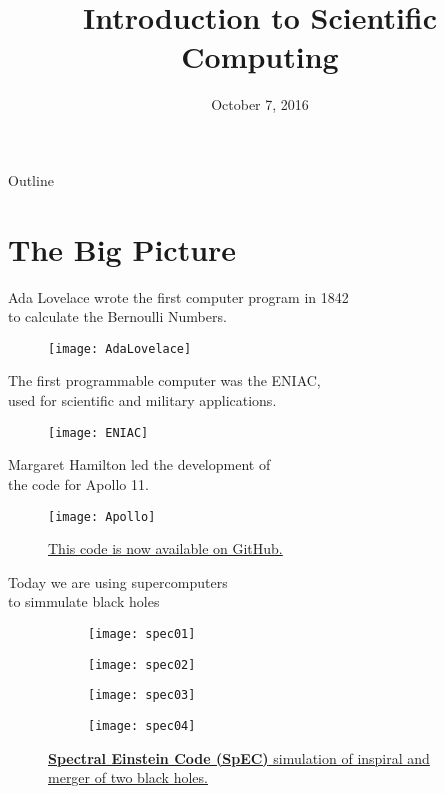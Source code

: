 \documentclass[xcolor={dvipsnames}]{beamer}
\title{Introduction to Scientific Computing}
\date{October 7, 2016}
\begin{document}
\begin{frame}
  \titlepage
\end{frame}

\begin{frame}{Outline}
  \tableofcontents
\end{frame}


\section{The Big Picture}

\begin{frame}{Ada Lovelace wrote the first computer program in 1842\\ to calculate the Bernoulli Numbers.}{}
\begin{figure}
\centering
\texttt{[image: AdaLovelace]}
\label{fig:AdaLovelace}
\end{figure}

\end{frame}

\begin{frame}{The first programmable computer was the ENIAC,\\ used for scientific and military applications.}{}
\begin{figure}
\centering
\texttt{[image: ENIAC]}
\label{fig:ENIAC}
\end{figure}
\end{frame}

\begin{frame}{Margaret Hamilton led the development of\\ the code for Apollo 11.}{}
\begin{figure}
\centering
\texttt{[image: Apollo]}
\label{fig:Apollo}
\caption*{\href{https://github.com/chrislgarry/Apollo-11}{This code is now available on GitHub.}}
\end{figure}
\end{frame}


\begin{frame}{Today we are using supercomputers\\ to simmulate black holes}{}
\begin{figure}[H]
\centering
\begin{subfigure}{.24\textwidth}
	\centering
	\texttt{[image: spec01]}
\end{subfigure}
\begin{subfigure}{.24\textwidth}
	\centering
	\texttt{[image: spec02]}
\end{subfigure}
\begin{subfigure}{.24\textwidth}
	\centering
	\texttt{[image: spec03]}
\end{subfigure}
\begin{subfigure}{.24\textwidth}
	\centering
	\texttt{[image: spec04]}
\end{subfigure}
\label{fig:spec}
\caption*{\href{https://www.black-holes.org/SpEC.html}{\textbf{Spectral Einstein Code (SpEC)} simulation of inspiral and merger of two black holes.}}
\end{figure}
\end{frame}
\end{document}
